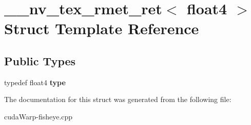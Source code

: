\hypertarget{struct____nv__tex__rmet__ret_3_01float4_01_4}{}\section{\+\_\+\+\_\+nv\+\_\+tex\+\_\+rmet\+\_\+ret$<$ float4 $>$ Struct Template Reference}
\label{struct____nv__tex__rmet__ret_3_01float4_01_4}
\subsection*{Public Types}
\begin{DoxyCompactItemize}
\item 
typedef float4 {\bfseries type}\hypertarget{struct____nv__tex__rmet__ret_3_01float4_01_4_a600055ec744d547a0ec77648ab12d421}{}\label{struct____nv__tex__rmet__ret_3_01float4_01_4_a600055ec744d547a0ec77648ab12d421}

\end{DoxyCompactItemize}


The documentation for this struct was generated from the following file\+:\begin{DoxyCompactItemize}
\item 
cuda\+Warp-\/fisheye.\+cpp\end{DoxyCompactItemize}
